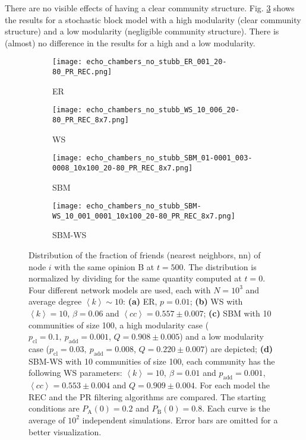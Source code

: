 \documentclass[11 pt , letterpaper , twoside , openright]{book}
\begin{document}
\newline
There are no visible effects of having a clear community structure. Fig. \ref{sbm} shows the results for a stochastic block model with a high modularity (clear community structure) and a low modularity (negligible community structure). There is (almost) no difference in the results for a high and a low modularity.
\newpage
\begin{figure}[H]
  \begin{subfigure}[b]{0.49\textwidth}
    \caption{ER}
  	\texttt{[image: echo\_chambers\_no\_stubb\_ER\_001\_20-80\_PR\_REC.png]}
    \label{er_echo_20-80}
  \end{subfigure}
  \begin{subfigure}[b]{0.49\textwidth}
    \caption{WS}
  	\texttt{[image: echo\_chambers\_no\_stubb\_WS\_10\_006\_20-80\_PR\_REC\_8x7.png]}
    \label{ws}
  \end{subfigure}
  \begin{subfigure}[b]{0.49\textwidth}
    \caption{SBM}
    \texttt{[image: echo\_chambers\_no\_stubb\_SBM\_01-0001\_003-0008\_10x100\_20-80\_PR\_REC\_8x7.png]}
  	\label{sbm}    
  \end{subfigure}
  \begin{subfigure}[b]{0.49\textwidth}
    \caption{SBM-WS}
    \texttt{[image: echo\_chambers\_no\_stubb\_SBM-WS\_10\_001\_0001\_10x100\_20-80\_PR\_REC\_8x7.png]}
    \label{sbm-ws}
  \end{subfigure}
  \captionsetup{format=plain}
  \caption[Distribution of the fraction of friends (nearest neighbors, nn) of node $i$ with the same opinion B at $t=500$, $\left<P_\text{B}^{\text{nn}}\right>$, for an initial $20/80$ opinion distribution.]{Distribution of the fraction of friends (nearest neighbors, nn) of node $i$ with the same opinion B at $t = 500$. The distribution is normalized by dividing for the same quantity computed at $t=0$. Four different network models are used, each with $N = 10^3$ and average degree $\left<k\right> \sim 10$: \textbf{(a)} ER, $p=0.01$; \textbf{(b)} WS with $\left<k\right> = 10$, $\beta = 0.06$ and $\left<cc\right> = 0.557 \pm 0.007$; \textbf{(c)} SBM with 10 communities of size 100, a high modularity case ($p_{\text{cl}} = 0.1,\ p_{\text{add}} = 0.001$, $Q = 0.908 \pm 0.005$) and a low modularity case ($p_{\text{cl}} = 0.03,\ p_{\text{add}} = 0.008$, $Q = 0.220 \pm 0.007$) are depicted; \textbf{(d)} SBM-WS with 10 communities of size 100, each community has the following WS parameters: $\left<k\right> = 10,\ \beta = 0.01$ and $p_{\text{add}} = 0.001$, $\left<cc\right> = 0.553 \pm 0.004$ and $Q = 0.909 \pm 0.004$. For each model the REC and the PR filtering algorithms are compared. The starting conditions are $P_\text{A}(0) = 0.2$ and $P_\text{B}(0) = 0.8$. Each curve is the average of $10^2$ independent simulations. Error bars are omitted for a better visualization.}
\label{echo_20_80}
\end{figure}
\end{document}
